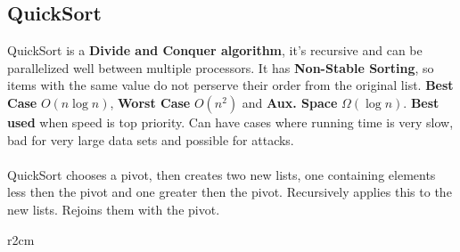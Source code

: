 \documentclass{article}
\newcommand{\thickbox}[1]{\setlength{\fboxrule}{1.3pt}\fbox{#1}\setlength{\fboxrule}{0.4pt}}
\begin{document}
\vspace{10 mm}


\subsection{QuickSort}
QuickSort is a {\bf Divide and Conquer algorithm}, it's recursive and can be parallelized well between multiple processors. It has {\bf Non-Stable Sorting}, so items with the same value do not perserve their order from the original list. {\bf Best Case} $O(n \log n)$, {\bf Worst Case} $O(n^2)$ and {\bf Aux. Space} $\Omega(\log n)$. {\bf Best used} when speed is top priority. Can have cases where running time is very slow, bad for very large data sets and possible for attacks.
\\ \\
QuickSort chooses a pivot, then creates two new lists, one containing elements less then the pivot and one greater then the pivot. Recursively applies this to the new lists. Rejoins them with the pivot.


\begin{wrapfigure}{r}{2cm}
\end{wrapfigure}
\end{document}
